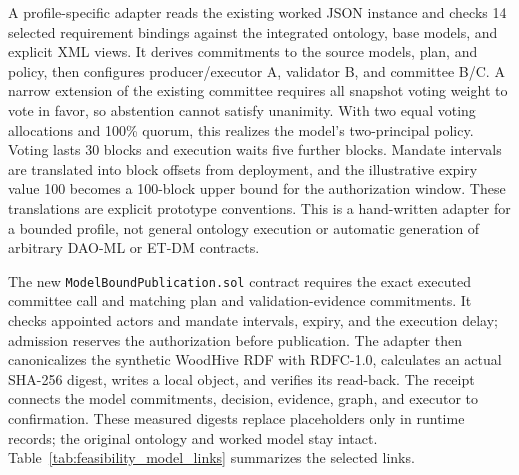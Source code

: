 \documentclass[journal]{IEEEtran}
\begin{document}
A profile-specific adapter reads the existing worked JSON instance and
checks 14 selected requirement bindings against the integrated ontology,
base models, and explicit XML views. It derives commitments to the source
models, plan, and policy, then configures producer/executor A, validator B,
and committee B/C. A narrow extension of the existing committee requires all snapshot
voting weight to vote in favor, so abstention cannot satisfy unanimity.
With two equal voting allocations and 100\% quorum, this realizes the
model's two-principal policy. Voting lasts 30 blocks and execution
waits five further blocks. Mandate intervals are translated into
block offsets from deployment, and the illustrative expiry value 100 becomes
a 100-block upper bound for the authorization window. These translations
are explicit prototype conventions. This is a hand-written adapter for a
bounded profile, not general ontology execution or automatic generation
of arbitrary DAO-ML or ET-DM contracts.

The new \texttt{ModelBoundPublication.sol} contract requires the exact
executed committee call and matching plan and validation-evidence commitments.
It checks appointed actors and mandate intervals, expiry, and the execution
delay; admission reserves the authorization before publication. The adapter
then canonicalizes the synthetic WoodHive RDF with RDFC-1.0, calculates an
actual SHA-256 digest, writes a local object, and verifies its read-back.
The receipt connects the model commitments, decision, evidence, graph,
and executor to confirmation. These measured digests replace placeholders
only in runtime records; the original ontology and worked model stay intact.
Table~\ref{tab:feasibility_model_links} summarizes the selected links.
\end{document}

